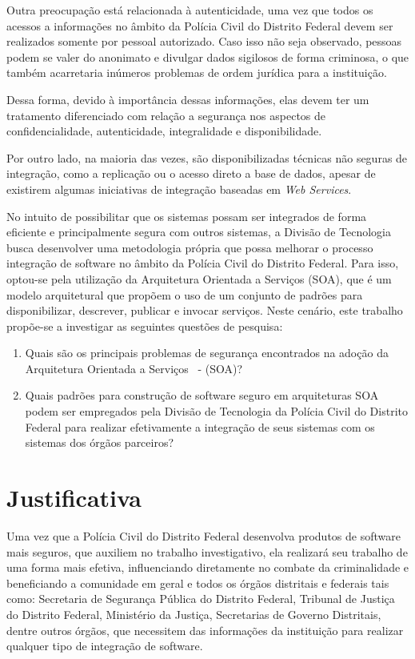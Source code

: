 Outra preocupação está relacionada à autenticidade, uma vez que todos os acessos a informações no âmbito da Polícia Civil do Distrito Federal devem ser realizados somente por pessoal autorizado. Caso isso não seja observado, pessoas podem se valer do anonimato e divulgar dados sigilosos de forma criminosa, o que também acarretaria inúmeros problemas de ordem jurídica para a instituição.

Dessa forma, devido à importância dessas informações, elas devem ter um tratamento diferenciado com relação a segurança nos aspectos de confidencialidade, autenticidade, integralidade e disponibilidade.

Por outro lado, na maioria das vezes, são disponibilizadas técnicas não seguras de integração, como a replicação ou o acesso direto a base de dados, apesar de existirem algumas iniciativas de integração baseadas em \emph{Web Services}.

No intuito de possibilitar que os sistemas possam ser integrados de forma eficiente e principalmente segura com outros sistemas, a Divisão de Tecnologia busca desenvolver uma metodologia própria que possa melhorar o processo integração de software no âmbito da Polícia Civil do Distrito Federal.
Para isso, optou-se pela utilização da Arquitetura Orientada a Serviços (SOA), que é um modelo arquitetural que propõem o uso de um conjunto de padrões para disponibilizar, descrever, publicar e invocar serviços. Neste cenário, este trabalho propõe-se a investigar as seguintes questões de pesquisa:

\begin{enumerate}
	\item Quais são os principais problemas de segurança encontrados na adoção da Arquitetura Orientada a Serviços \ - (SOA)?
	\item Quais padrões para construção de software seguro em arquiteturas SOA podem ser empregados pela Divisão de Tecnologia da Polícia Civil do Distrito Federal para realizar efetivamente a integração de seus sistemas com os sistemas dos órgãos parceiros?
\end{enumerate}


\section{Justificativa}

Uma vez que a Polícia Civil do Distrito Federal desenvolva produtos de software mais seguros, que auxiliem no trabalho investigativo, ela realizará seu trabalho de uma forma mais efetiva, influenciando diretamente no combate da criminalidade e beneficiando a comunidade em geral e todos os órgãos distritais e federais tais como: Secretaria de Segurança Pública do Distrito Federal, Tribunal de Justiça do Distrito Federal, Ministério da Justiça, Secretarias de Governo Distritais, dentre outros órgãos, que necessitem das informações da instituição para realizar qualquer tipo de integração de software.


